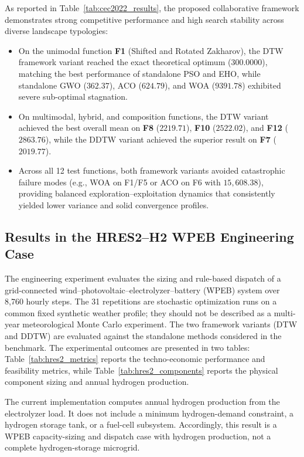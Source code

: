 As reported in Table~\ref{tab:cec2022_results}, the proposed collaborative framework demonstrates strong competitive performance and high search stability across diverse landscape typologies:
\begin{itemize}
    \item On the unimodal function \textbf{F1} (Shifted and Rotated Zakharov), the DTW framework variant reached the exact theoretical optimum ($300.0000$), matching the best performance of standalone PSO and EHO, while standalone GWO ($362.37$), ACO ($624.79$), and WOA ($9391.78$) exhibited severe sub-optimal stagnation.
    \item On multimodal, hybrid, and composition functions, the DTW variant achieved the best overall mean on \textbf{F8} ($2219.71$), \textbf{F10} ($2522.02$), and \textbf{F12} ($2863.76$), while the DDTW variant achieved the superior result on \textbf{F7} ($2019.77$).
    \item Across all 12 test functions, both framework variants avoided catastrophic failure modes (e.g., WOA on F1/F5 or ACO on F6 with $15{,}608.38$), providing balanced exploration--exploitation dynamics that consistently yielded lower variance and solid convergence profiles.
\end{itemize}





\subsection{Results in the HRES2--H2 WPEB Engineering Case}
\label{sec:results_hres2}

The engineering experiment evaluates the sizing and rule-based dispatch of a
grid-connected wind--photovoltaic--electrolyzer--battery (WPEB) system over
8,760 hourly steps. The 31 repetitions are stochastic optimization runs on a
common fixed synthetic weather profile; they should not be described as a
multi-year meteorological Monte Carlo experiment. The two framework variants
(DTW and DDTW) are evaluated against the standalone methods considered in the
benchmark. The experimental outcomes are presented in two tables: Table~\ref{tab:hres2_metrics} reports the
techno-economic performance and feasibility metrics, while
Table~\ref{tab:hres2_components} reports the physical component sizing and
annual hydrogen production.

The current implementation computes annual hydrogen production from the
electrolyzer load. It does not include a minimum hydrogen-demand constraint, a
hydrogen storage tank, or a fuel-cell subsystem. Accordingly, this result is a
WPEB capacity-sizing and dispatch case with hydrogen production, not a
complete hydrogen-storage microgrid.

